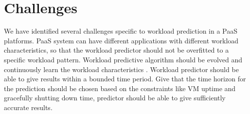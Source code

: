 \usepackage{multirow}


\section{Challenges}

We have identified several challenges specific to workload prediction in a PaaS platforms.
PaaS system can have different applications with different workload characteristics, so that the workload predictor should not be overfitted to a specific workload pattern.
Workload predictive algorithm should be evolved and continuously learn the workload characteristics . 
Workload predictor should be able to give results within a bounded time period.
Give that the  time horizon for the prediction should be chosen based on the constraints like VM uptime and gracefully shutting down time, predictor should be able to give sufficiently accurate results.


